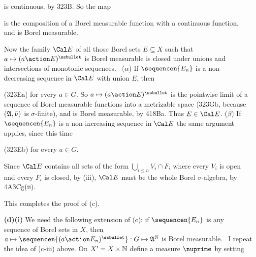{\noindent is continuous, by 323B.   So the map


\noindent is the composition of a Borel measurable function with a
continuous function, and is Borel measurable.\ \Qed

\medskip

 Now the family $\Cal E$ of all those Borel sets
$E\subseteq X$ such that $a\mapsto(a\action E)^{\ssbullet}$ is Borel
measurable is closed under unions and intersections of monotonic
sequences.   \Prf\ ($\alpha$) If $\sequencen{E_n}$ is a non-decreasing
sequence in $\Cal E$ with union $E$, then


\noindent (323Ea) for every $a\in G$.   So
$a\mapsto(a\action E)^{\ssbullet}$ is
the pointwise limit of a sequence of Borel measurable functions into a
metrizable space (323Gb, because $(\frak A,\bar\nu)$ is
$\sigma$-finite), and is Borel measurable, by 418Ba.   Thus
$E\in\Cal E$.   ($\beta$) If $\sequencen{E_n}$ is a non-increasing
sequence in $\Cal E$ the same argument applies, since this time


\noindent (323Eb) for every $a\in G$.\ \Qed

Since $\Cal E$ contains all sets of the form
$\bigcup_{i\le n}V_i\cap F_i$ where every $V_i$ is open and every $F_i$
is closed, by (iii), $\Cal E$ must be the whole Borel $\sigma$-algebra,
by 4A3Cg(ii).

This completes the proof of (c).

\medskip

{\bf (d)(i)} We need the following extension of (c):  if
$\sequencen{E_n}$ is any sequence of Borel sets in $X$, then
$a\mapsto\sequencen{(a\action E_n)^{\ssbullet}}:
  G\mapsto\frak A^{\Bbb N}$ is Borel measurable.   \Prf\ I repeat the
idea of (c-iii) above.
On $X'=X\times\Bbb N$ define a measure $\nuprime$ by setting


}
